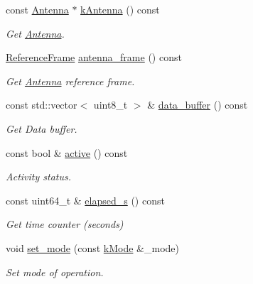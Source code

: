 \begin{DoxyCompactItemize}
const \hyperlink{classosse_1_1collaborate_1_1_antenna}{Antenna} $\ast$ \hyperlink{classosse_1_1collaborate_1_1_subsystem_comm_a1279c0e9906325a8aff5a04de1af15d8}{k\+Antenna} () const
\begin{DoxyCompactList}\small\item\em Get \hyperlink{classosse_1_1collaborate_1_1_antenna}{Antenna}. \end{DoxyCompactList}\item 
\hyperlink{classosse_1_1collaborate_1_1_reference_frame}{Reference\+Frame} \hyperlink{classosse_1_1collaborate_1_1_subsystem_comm_a8e4f0338a3fb3d26a620316938c02cbd}{antenna\+\_\+frame} () const
\begin{DoxyCompactList}\small\item\em Get \hyperlink{classosse_1_1collaborate_1_1_antenna}{Antenna} reference frame. \end{DoxyCompactList}\item 
const std\+::vector$<$ uint8\+\_\+t $>$ \& \hyperlink{classosse_1_1collaborate_1_1_subsystem_comm_ab42ca920118cc2a528ef7dd8360f6e64}{data\+\_\+buffer} () const
\begin{DoxyCompactList}\small\item\em Get Data buffer. \end{DoxyCompactList}\item 
const bool \& \hyperlink{classosse_1_1collaborate_1_1_subsystem_comm_a217614042fd340158f7c7538e7bec530}{active} () const
\begin{DoxyCompactList}\small\item\em Activity status. \end{DoxyCompactList}\item 
const uint64\+\_\+t \& \hyperlink{classosse_1_1collaborate_1_1_subsystem_comm_a688d10c873c2a5992b88ed5b9ba6b369}{elapsed\+\_\+s} () const
\begin{DoxyCompactList}\small\item\em Get time counter (seconds) \end{DoxyCompactList}\item 
void \hyperlink{classosse_1_1collaborate_1_1_subsystem_comm_a25bea17a1d9e372e0e8da1dfe999fd75}{set\+\_\+mode} (const \hyperlink{classosse_1_1collaborate_1_1_subsystem_comm_a5e1ce4f232ca2aae0b99d1225e682190}{k\+Mode} \&\+\_\+mode)
\begin{DoxyCompactList}\small\item\em Set mode of operation. \end{DoxyCompactList}\item 

\end{DoxyCompactItemize}
